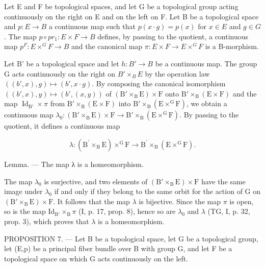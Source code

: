 Let E and F be topological spaces, and let G be a topological group acting continuously on the right on E and on the left on F. Let B be a topological space and \(p\colon E \to B\) a continuous map such that \(p(x \cdot g) = p(x)\) for \(x \in E\) and \(g \in G\) . The map \(p \circ pr_{1}\colon E \times F \to B\) defines, by passing to the quotient, a continuous map \(p^{F}\colon E \times^{G} F \to B\) and the canonical map \(\pi\colon E \times F \to E \times^{G} F\) is a B-morphism.

Let B' be a topological space and let \(h\colon B'\to B\) be a continuous map. The group G acts continuously on the right on \(B'\times_{B}E\) by the operation law \(((b',x),g)\mapsto(b',x\cdot g)\). By composing the canonical isomorphism \(((b',x),y)\mapsto(b',(x,y))\) of \((\mathrm{B}'\times_{\mathrm{B}}\mathrm{E})\times\mathrm{F}\) onto \(\mathrm{B}'\times_{\mathrm{B}}(\mathrm{E}\times\mathrm{F})\) and the map \(\operatorname{Id}_{\mathrm{B}'}\times\pi\) from \(\mathrm{B}'\times_{\mathrm{B}}(\mathrm{E}\times\mathrm{F})\) into \(\mathrm{B}'\times_{\mathrm{B}}(\mathrm{E}\times^{\mathrm{G}}\mathrm{F})\), we obtain a continuous map \(\lambda_{0}\colon(\mathrm{B}'\times_{\mathrm{B}}\mathrm{E})\times\mathrm{F}\to\mathrm{B}'\times_{\mathrm{B}}(\mathrm{E}\times^{\mathrm{G}}\mathrm{F})\). By passing to the quotient, it defines a continuous map

\[
\lambda \colon (\mathrm{B} ^ {\prime} \times_ {\mathrm{B}} \mathrm{E}) \times^ {\mathrm{G}} \mathrm{F} \rightarrow \mathrm{B} ^ {\prime} \times_ {\mathrm{B}} (\mathrm{E} \times^ {\mathrm{G}} \mathrm{F}).
\]

Lemma. --- The map λ is a homeomorphism.

The map \(\lambda_0\) is surjective, and two elements of \((\mathrm{B}' \times_{\mathrm{B}} \mathrm{E}) \times \mathrm{F}\) have the same image under \(\lambda_0\) if and only if they belong to the same orbit for the action of G on \((\mathrm{B}' \times_{\mathrm{B}} \mathrm{E}) \times \mathrm{F}\). It follows that the map \(\lambda\) is bijective. Since the map \(\pi\) is open, so is the map \(\mathrm{Id}_{\mathrm{B}'} \times_{\mathrm{B}} \pi\) (I, p. 17, prop. 8), hence so are \(\lambda_0\) and \(\lambda\) (TG, I, p. 32, prop. 3), which proves that \(\lambda\) is a homeomorphism.

PROPOSITION 7. --- Let B be a topological space, let G be a topological group, let (E,p) be a principal fiber bundle over B with group G, and let F be a topological space on which G acts continuously on the left.

